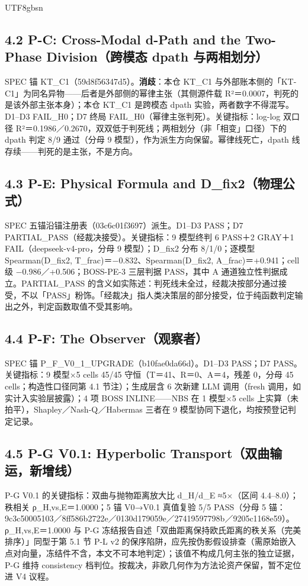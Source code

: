 \documentclass[10pt,a4paper]{article}
\begin{document}
\begin{CJK}{UTF8}{gbsn}
\subsection*{4.2 P-C: Cross-Modal d-Path and the Two-Phase Division（跨模态 dpath 与两相划分）}SPEC 锚 KT\_C1（59d8f56347d5）。\textbf{消歧}：本仓 KT\_C1 与外部账本侧的「KT-C1」为同名异物——后者是外部侧的幂律主张（其侧源件载 R²＝0.0007，判死的是该外部主张本身）；本仓 KT\_C1 是跨模态 dpath 实验，两者数字不得混写。D1–D3 FAIL\_H0；D7 终局 FAIL\_H0（幂律主张判死）。关键指标：log-log 双口径 R²＝0.1986／0.2670，双双低于判死线；两相划分（非「相变」口径）下的 dpath 判定 8/9 通过（分母 9 模型），作为派生方向保留。幂律线死亡，dpath 线存续——判死的是主张，不是方向。

\subsection*{4.3 P-E: Physical Formula and D\_fix2（物理公式）}SPEC 五锚沿锚注册表（03c6c01f3697）派生。D1–D3 PASS；D7 PARTIAL\_PASS（经裁决接受）。关键指标：9 模型终判 6 PASS＋2 GRAY＋1 FAIL（deepseek-v4-pro，分母 9 模型）；D\_fix2 分布 8/1/0；逐模型 Spearman(D\_fix2, T\_frac)＝−0.832、Spearman(D\_fix2, A\_frac)＝+0.941；cell 级 −0.986／+0.506；BOSS-PE-3 三层判据 PASS，其中 A 通道独立性判据成立。PARTIAL\_PASS 的含义如实陈述：判死线未全过，经裁决按部分通过接受，不以「PASS」粉饰。「经裁决」指人类决策层的部分接受，位于纯函数判定输出之外，判定函数取值不受其影响。

\subsection*{4.4 P-F: The Observer（观察者）}SPEC 锚 P\_F\_V0\_1\_UPGRADE（b10fae0da66d）。D1–D3 PASS；D7 PASS。关键指标：9 模型×5 cells 45/45 守恒（T＝41、R＝0、A＝4，残差 0，分母 45 cells；构造性口径同第 4.1 节注）；生成层含 6 次新建 LLM 调用（fresh 调用，如实计入实验层披露）；4 项 BOSS INLINE——NBS 在 1 模型×5 cells 上实算（未拍平），Shapley／Nash-Q／Habermas 三者在 9 模型协同下退化，均按预登记判定记录。

\subsection*{4.5 P-G V0.1: Hyperbolic Transport（双曲输运，新增线）}P-G V0.1 的关键指标：双曲与抛物距离放大比 d\_H/d\_E ≈5×（区间 4.4–8.0）；秩相关 ρ\_H,vs,E＝1.0000；5 锚 V0→V0.1 真值复验 5/5 PASS（分母 5 锚：9c3c50005103／8ff586b2722e／0130d179059e／27419597798b／9205c1168e59）。ρ\_H,vs,E＝1.0000 与 P-G 冻结报告自述「双曲距离保持欧氏距离的秩关系（完美排序）」同型于第 5.1 节 P-L v2 的保序陷阱，应先按伪影假设排查（需原始嵌入点对向量，冻结件不含，本文不可本地判定）；该值不构成几何主张的独立证据，P-G 维持 consistency 档判位。按裁决，非欧几何作为方法论资产保留，暂不定位进 V4 议程。


\end{CJK}
\end{document}
